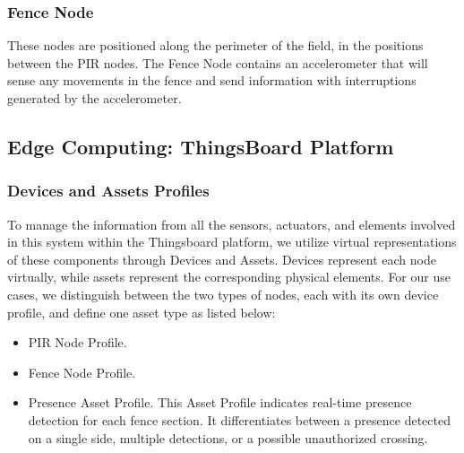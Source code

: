 \subsubsection*{Fence Node}

These nodes are positioned along the perimeter of the field, in the positions between the PIR nodes. The Fence Node contains an accelerometer that will sense 
any movements in the fence and send information with interruptions generated by the accelerometer.

\subsection{Edge Computing: ThingsBoard Platform}

\subsubsection*{Devices and Assets Profiles}

To manage the information from all the sensors, actuators, and elements involved in this system within the Thingsboard platform, we utilize virtual representations of 
these components through Devices and Assets. Devices represent each node virtually, while assets represent the corresponding physical elements. For our use cases, we 
distinguish between the two types of nodes, each with its own device profile, and define one asset type as listed below:
\begin{itemize}
    \item PIR Node Profile.
    \item Fence Node Profile.
    \item Presence Asset Profile. This Asset Profile indicates real-time presence detection for each fence section. It differentiates between a presence detected on 
    a single side, multiple detections, or a possible unauthorized crossing.
\end{itemize}

